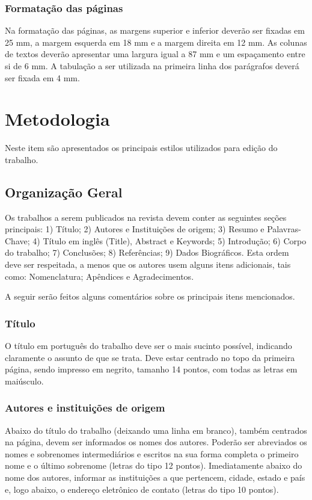 \documentclass[portugues]{sobraep}
\begin{document}
\subsubsection{Formatação das páginas}

Na formatação das páginas, as margens superior e inferior deverão ser fixadas em 25 mm, a margem esquerda em 18 mm e a margem direita em 12 mm. As colunas de textos deverão apresentar uma largura igual a 87 mm e um espaçamento entre si de 6 mm. A tabulação a ser utilizada na primeira linha dos parágrafos deverá ser fixada em 4 mm.

\section{Metodologia}

Neste item são apresentados os principais estilos utilizados para edição do trabalho.

\subsection{Organização Geral}

Os trabalhos a serem publicados na revista devem conter as seguintes seções principais: 1) Título; 2) Autores e Instituições de origem; 3) Resumo e Palavras-Chave; 4) Título em inglês (Title), Abstract e Keywords; 5) Introdução; 6) Corpo do trabalho; 7) Conclusões; 8) Referências; 9) Dados Biográficos. Esta ordem deve ser respeitada, a menos que os autores usem alguns itens adicionais, tais como: Nomenclatura; Apêndices e Agradecimentos.

A seguir serão feitos alguns comentários sobre os principais itens mencionados.

\subsubsection{Título}
O título em português do trabalho deve ser o mais sucinto possível, indicando claramente o assunto de que se trata. Deve estar centrado no topo da primeira página, sendo impresso em negrito, tamanho 14 pontos, com todas as letras em maiúsculo.

\subsubsection{Autores e instituições de origem}
Abaixo do título do trabalho (deixando uma linha em branco), também centrados na página, devem ser informados os nomes dos autores. Poderão ser abreviados os nomes e sobrenomes intermediários e escritos na sua forma completa o primeiro nome e o último sobrenome (letras do tipo 12 pontos). Imediatamente abaixo do nome dos autores, informar as instituições a que pertencem, cidade, estado e país e, logo abaixo, o endereço eletrônico de contato (letras do tipo 10 pontos).
\end{document}
